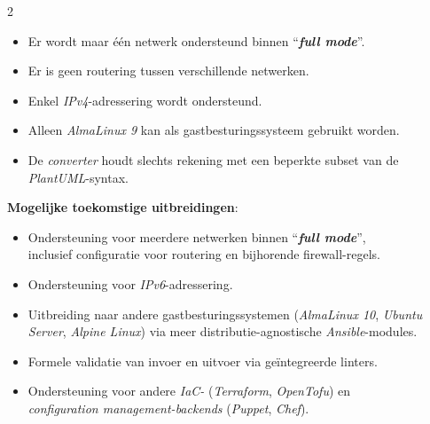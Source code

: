 \documentclass[a0,portrait]{hogent-poster}
\begin{document}
\begin{multicols}{2}
      \begin{itemize}[leftmargin=2cm]
            \item[\textcolor{hogent-orange}{\large \textbf{-- }}] Er wordt maar één netwerk ondersteund binnen ``\textcolor{hogent-darkgreen}{\textbf{\emph{full mode}}}''.
            \item[\textcolor{hogent-orange}{\large \textbf{-- }}] Er is geen routering tussen verschillende netwerken.
            \item[\textcolor{hogent-orange}{\large \textbf{-- }}] Enkel \emph{IPv4}-adressering wordt ondersteund.
            \item[\textcolor{hogent-orange}{\large \textbf{-- }}] Alleen \emph{AlmaLinux 9} kan als gastbesturingssysteem gebruikt worden.
            \item[\textcolor{hogent-orange}{\large \textbf{-- }}] De \emph{converter} houdt slechts rekening met een beperkte subset van de\\\emph{PlantUML}-syntax.
      \end{itemize}

      \textbf{Mogelijke toekomstige uitbreidingen}:

      \begin{itemize}[leftmargin=2cm]
            \item[\textcolor{hogent-lightgreen}{\large \textbf{+ }}] Ondersteuning voor meerdere netwerken binnen ``\textcolor{hogent-darkgreen}{\textbf{\emph{full mode}}}'', \\inclusief configuratie voor routering en bijhorende firewall-regels.
            \item[\textcolor{hogent-lightgreen}{\large \textbf{+ }}] Ondersteuning voor \emph{IPv6}-adressering.
            \item[\textcolor{hogent-lightgreen}{\large \textbf{+ }}] Uitbreiding naar andere gastbesturingssystemen (\emph{AlmaLinux 10}, \emph{Ubuntu\\Server}, \emph{Alpine Linux}) via meer distributie-agnostische \emph{Ansible}-modules.
            \item[\textcolor{hogent-lightgreen}{\large \textbf{+ }}] Formele validatie van invoer en uitvoer via geïntegreerde linters.
            \item[\textcolor{hogent-lightgreen}{\large \textbf{+ }}] Ondersteuning voor andere \emph{IaC-} (\emph{Terraform}, \emph{OpenTofu}) en\\\emph{configuration management-backends} (\emph{Puppet}, \emph{Chef}).
      \end{itemize}

\end{multicols}
\end{document}
